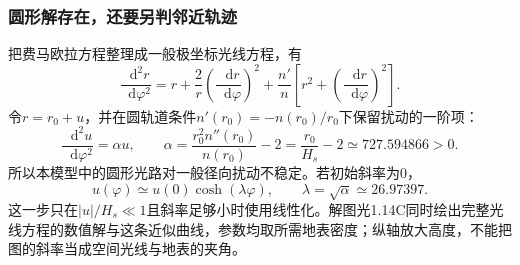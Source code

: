 \documentclass[UTF8,fontset=fandol,a4paper,11pt]{ctexart}
\newcommand{\dd}{\mathop{}\!\mathrm{d}}
\begin{document}
\subsubsection*{圆形解存在，还要另判邻近轨迹}
把费马欧拉方程整理成一般极坐标光线方程，有
\[
\frac{\dd^2r}{\dd\varphi^2}
=r+\frac2r\left(\frac{\dd r}{\dd\varphi}\right)^2
+\frac{n'}n\left[r^2+
\left(\frac{\dd r}{\dd\varphi}\right)^2\right].
\]
令$r=r_0+u$，并在圆轨道条件$n'(r_0)=-n(r_0)/r_0$下保留扰动的一阶项：
\[
\frac{\dd^2u}{\dd\varphi^2}
=\alpha u,\qquad
\alpha=\frac{r_0^2n''(r_0)}{n(r_0)}-2
=\frac{r_0}{H_s}-2\simeq727.594866>0.
\]
所以本模型中的圆形光路对一般径向扰动不稳定。若初始斜率为0，
\[
u(\varphi)\simeq u(0)\cosh(\lambda\varphi),\qquad
\lambda=\sqrt{\alpha}\simeq26.97397.
\]
这一步只在$|u|/H_s\ll1$且斜率足够小时使用线性化。解图光1.14C同时绘出完整光线方程的数值解与这条近似曲线，参数均取所需地表密度；纵轴放大高度，不能把图的斜率当成空间光线与地表的夹角。
\end{document}
